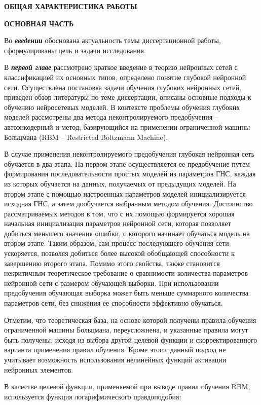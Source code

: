 \documentclass{thesisby}
\begin{document}
\bigskip
\newpage
\centerline{\bf ОБЩАЯ ХАРАКТЕРИСТИКА РАБОТЫ}
\medskip


\bigskip
\centerline{\bf ОСНОВНАЯ ЧАСТЬ}\medskip
Во \textbf{\textit{введении}} обоснована актуальность темы диссертационной работы, сформулированы цель и задачи исследования.

В \textbf{\textit{первой главе}} рассмотрено краткое введение в теорию нейронных сетей с классификацией их основных типов, определено понятие глубокой нейронной сети. Осуществлена постановка задачи обучения глубоких нейронных сетей, приведен обзор литературы по теме диссертации, описаны основные подходы к обучению нейросетевых моделей. В контексте проблемы обучения глубоких моделей рассмотрены два метода неконтролируемого предобучения -- автоэнкодерный и метод, базирующийся на применении ограниченной машины Больцмана (RBM -- Restricted Boltzmann Machine). 

В случае применения неконтролируемого предобучения глубокая нейронная сеть обучается в два этапа. На первом этапе осуществляется ее предобучение путем формирования последовательности простых моделей из параметров ГНС, каждая из которых обучается на данных, получаемых от предыдущих моделей. На втором этапе с помощью настроенных параметров моделей инициализируется исходная ГНС, а затем дообучается выбранным методом обучения. 
Достоинство рассматриваемых методов в том, что с их помощью формируется хорошая начальная инициализация параметров нейронной сети, которая позволяет добиться меньшего значения ошибки, с которого начинает обучаться модель на втором этапе. Таким образом, сам процесс последующего обучения сети ускоряется, позволяя добиться более высокой обобщающей способности к завершению второго этапа. Помимо этого свойства, также становится некритичным теоретическое требование о сравнимости количества параметров нейронной сети с размером обучающей выборки. При использовании предобучения обучающая выборка может быть меньше суммарного количества параметров сети, без снижения ее способности эффективно обучаться.

Отметим, что теоретическая база, на основе которой получены правила обучения ограниченной машины Больцмана, переусложнена, и указанные правила могут быть получены, исходя из выбора другой целевой функции и скорректированного варианта применения правил обучения. Кроме этого, данный подход не учитывает возможность использования нелинейных функций активации нейронных элементов.

В качестве целевой функции, применяемой при выводе правил обучения RBM, используется функция логарифмического правдоподобия:
 
\end{document}
